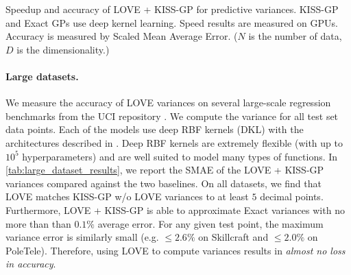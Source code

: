 \begin{table}[t!]
  \caption[Speedup and accuracy of LOVE + KISS-GP{} for predictive variances.]{
    Speedup and accuracy of LOVE + KISS-GP{} for predictive variances.
    KISS-GP and Exact GPs use deep kernel learning.
    Speed results are measured on GPUs.
    Accuracy is measured by Scaled Mean Average Error.
    ($N$ is the number of data, $D$ is the dimensionality.)
    \label{tab:large_dataset_results}
  }
  \vspace{0.5ex}
  \centering
  \resizebox{\textwidth}{!}{%
    
  }
  \vspace{1em}

  \resizebox{\textwidth}{!}{%
    
  }
\end{table}

\paragraph{Large datasets.}
We measure the accuracy of LOVE{} variances on several large-scale regression benchmarks from the UCI repository \cite{asuncion2007uci}.
We compute the variance for all test set data points.
Each of the models use deep RBF kernels (DKL) with the architectures described in \cite{wilson2016deep}.
Deep RBF kernels are extremely flexible (with up to $10^5$ hyperparameters) and are well suited to model many types of functions.
In \cref{tab:large_dataset_results}, we report the SMAE of the LOVE + KISS-GP{} variances compared against the two baselines.
On all datasets, we find that LOVE{} matches KISS-GP w/o LOVE{} variances to at least $5$ decimal points.
Furthermore, LOVE + KISS-GP{} is able to approximate Exact variances with no more than than $0.1\%$ average error.
For any given test point, the maximum variance error is similarly small (e.g. $\leq \! 2.6\%$ on Skillcraft and $\leq \! 2.0\%$ on PoleTele).
Therefore, using LOVE{} to compute variances results in \emph{almost no loss in accuracy}.

